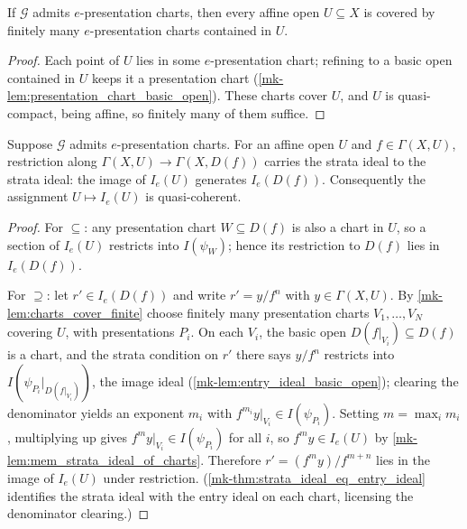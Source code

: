 \begin{lemma}
  \label{mk-lem:charts_cover_finite}
  \leanok

  If \(\mathcal G\) admits \(e\)-presentation charts, then every affine open
  \(U \subseteq X\) is covered by finitely many \(e\)-presentation charts
  contained in \(U\).
\end{lemma}

\begin{proof}
  \leanok
  Each point of \(U\) lies in some \(e\)-presentation chart; refining to a
  basic open contained in \(U\) keeps it a presentation chart
  (\ref{mk-lem:presentation_chart_basic_open}).  These charts cover \(U\), and
  \(U\) is quasi-compact, being affine, so finitely many of them suffice.
\end{proof}

\begin{theorem}
  \label{mk-thm:map_strata_ideal_basic_open}
  \leanok

  Suppose \(\mathcal G\) admits \(e\)-presentation charts.  For an affine open
  \(U\) and \(f \in \Gamma(X, U)\), restriction along
  \(\Gamma(X, U) \to \Gamma(X, D(f))\) carries the strata ideal to the strata
  ideal: the image of \(I_e(U)\) generates \(I_e(D(f))\).  Consequently the
  assignment \(U \mapsto I_e(U)\) is quasi-coherent.
\end{theorem}

\begin{proof}
  \leanok
  For \(\subseteq\): any presentation chart \(W \subseteq D(f)\) is also a
  chart in \(U\), so a section of \(I_e(U)\) restricts into \(I(\psi_W)\);
  hence its restriction to \(D(f)\) lies in \(I_e(D(f))\).

  For \(\supseteq\): let \(r' \in I_e(D(f))\) and write
  \(r' = y / f^{n}\) with \(y \in \Gamma(X, U)\).  By
  \ref{mk-lem:charts_cover_finite} choose finitely many presentation charts
  \(V_1, \dots, V_N\) covering \(U\), with presentations \(P_i\).  On each
  \(V_i\), the basic open \(D(f|_{V_i}) \subseteq D(f)\) is a chart, and the
  strata condition on \(r'\) there says \(y / f^{n}\) restricts into
  \(I(\psi_{P_i}|_{D(f|_{V_i})})\), the image ideal
  (\ref{mk-lem:entry_ideal_basic_open}); clearing the denominator yields an
  exponent \(m_i\) with \(f^{m_i} y|_{V_i} \in I(\psi_{P_i})\).  Setting
  \(m = \max_i m_i\), multiplying up gives
  \(f^{m} y|_{V_i} \in I(\psi_{P_i})\) for all \(i\), so
  \(f^{m} y \in I_e(U)\) by \ref{mk-lem:mem_strata_ideal_of_charts}.  Therefore
  \(r' = (f^{m} y) / f^{m + n}\) lies in the image of \(I_e(U)\) under
  restriction.  (\ref{mk-thm:strata_ideal_eq_entry_ideal} identifies the strata
  ideal with the entry ideal on each chart, licensing the denominator
  clearing.)
\end{proof}

